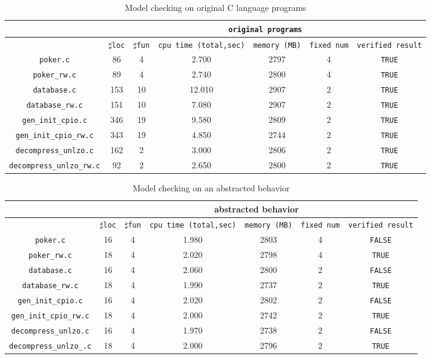 \begin{table}
  \scriptsize
\begin{tabular}{|c|c|c|c|c|c|c|}
\hline
& \multicolumn{6}{|c|}{\texttt{original programs}}  \\
\hline
 & $\sharp$\texttt{loc} & $\sharp$\texttt{fun} & \texttt{cpu time (total,sec)} & \texttt{memory (MB)} & \texttt{fixed num}& \texttt{verified result} \\
\hline
\texttt{poker.c} & 86 & 4 & 2.700 & 2797 & 4  & \texttt{TRUE}  \\
\hline
\texttt{poker\_rw.c} & 89 & 4 & 2.740 & 2800 & 4  & \texttt{TRUE}  \\
\hline
\texttt{database.c} & 153 & 10 & 12.010 & 2907 & 2  & \texttt{TRUE}  \\
\hline
\texttt{database\_rw.c} & 151 & 10 & 7.080 & 2907 & 2  & \texttt{TRUE}  \\
\hline
\texttt{gen\_init\_cpio.c} & 346 & 19 & 9.580 & 2809 & 2  & \texttt{TRUE}  \\
\hline
\texttt{gen\_init\_cpio\_rw.c} & 343 &19  & 4.850  & 2744  & 2  & \texttt{TRUE}  \\
\hline
\texttt{decompress\_unlzo.c} & 162 & 2  & 3.000  & 2806  & 2  & \texttt{TRUE}  \\
\hline
\texttt{decompress\_unlzo\_rw.c} & 92 & 2  & 2.650  & 2800  & 2  & \texttt{TRUE}  \\

\hline
\end{tabular}
\caption{Model checking on original C language programs}
\label{tb:mcc}
\end{table}

\begin{table}
  \scriptsize
\begin{tabular}{|c|c|c|c|c|c|c|}
\hline
&\multicolumn{6}{|c|}{abstracted behavior} \\
\hline
 &$\sharp$\texttt{loc} & $\sharp$\texttt{fun} & \texttt{cpu time (total,sec)} & \texttt{memory (MB)} & \texttt{fixed num} & \texttt{verified result} \\
\hline
\texttt{poker.c} & 16 & 4 & 1.980 & 2803 & 4  & \texttt{FALSE}  \\
\hline
\texttt{poker\_rw.c} & 18 & 4 & 2.020 & 2798 & 4  & \texttt{TRUE}  \\
\hline
\texttt{database.c} &  16 & 4 & 2.060 & 2800 & 2 & \texttt{FALSE} \\
\hline
\texttt{database\_rw.c} &  18 & 4 & 1.990 & 2737 & 2 & \texttt{TRUE} \\
\hline
\texttt{gen\_init\_cpio.c} & 16 & 4 & 2.020 & 2802 & 2  & \texttt{FALSE}  \\
\hline
\texttt{gen\_init\_cpio\_rw.c} & 18 & 4 & 2.000  & 2742  & 2  & \texttt{TRUE}  \\
\hline
\texttt{decompress\_unlzo.c} & 16 & 4 & 1.970  & 2738  & 2  & \texttt{FALSE}  \\
\hline
\texttt{decompress\_unlzo\_.c} & 18 & 4  & 2.000  & 2796  & 2  & \texttt{TRUE}  \\

\hline
\end{tabular}
\caption{Model checking on an abstracted behavior}
\label{tb:mca}
\end{table}

